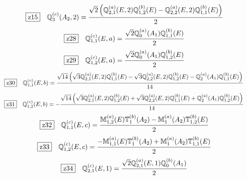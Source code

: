 \documentclass[fleqn,10pt,landscape]{jsarticle}
\begin{document}
\begin{dmath*}
\hspace*{3mm}\fbox{z15}\quad \mathbb{Q}_{3}^{(c)}(A_{2},2)=\frac{\sqrt{2} \left(\mathbb{Q}_{2,1}^{(a)}(E,2) \mathbb{Q}_{1,2}^{(b)}(E) - \mathbb{Q}_{2,2}^{(a)}(E,2) \mathbb{Q}_{1,1}^{(b)}(E)\right)}{2}
\end{dmath*}
\begin{dmath*}
\hspace*{3mm}\fbox{z28}\quad \mathbb{Q}_{1,1}^{(c)}(E,a)=\frac{\sqrt{2} \mathbb{Q}_{0}^{(a)}(A_{1}) \mathbb{Q}_{1,1}^{(b)}(E)}{2}
\end{dmath*}
\begin{dmath*}
\hspace*{3mm}\fbox{z29}\quad \mathbb{Q}_{1,2}^{(c)}(E,a)=\frac{\sqrt{2} \mathbb{Q}_{0}^{(a)}(A_{1}) \mathbb{Q}_{1,2}^{(b)}(E)}{2}
\end{dmath*}
\begin{dmath*}
\hspace*{3mm}\fbox{z30}\quad \mathbb{Q}_{1,1}^{(c)}(E,b)=\frac{\sqrt{14} \left(\sqrt{3} \mathbb{Q}_{2,1}^{(a)}(E,2) \mathbb{Q}_{1,1}^{(b)}(E) - \sqrt{3} \mathbb{Q}_{2,2}^{(a)}(E,2) \mathbb{Q}_{1,2}^{(b)}(E) - \mathbb{Q}_{2}^{(a)}(A_{1}) \mathbb{Q}_{1,1}^{(b)}(E)\right)}{14}
\end{dmath*}
\begin{dmath*}
\hspace*{3mm}\fbox{z31}\quad \mathbb{Q}_{1,2}^{(c)}(E,b)=- \frac{\sqrt{14} \left(\sqrt{3} \mathbb{Q}_{2,1}^{(a)}(E,2) \mathbb{Q}_{1,2}^{(b)}(E) + \sqrt{3} \mathbb{Q}_{2,2}^{(a)}(E,2) \mathbb{Q}_{1,1}^{(b)}(E) + \mathbb{Q}_{2}^{(a)}(A_{1}) \mathbb{Q}_{1,2}^{(b)}(E)\right)}{14}
\end{dmath*}
\begin{dmath*}
\hspace*{3mm}\fbox{z32}\quad \mathbb{Q}_{1,1}^{(c)}(E,c)=\frac{\mathbb{M}_{1,2}^{(a)}(E) \mathbb{T}_{1}^{(b)}(A_{2}) - \mathbb{M}_{1}^{(a)}(A_{2}) \mathbb{T}_{1,2}^{(b)}(E)}{2}
\end{dmath*}
\begin{dmath*}
\hspace*{3mm}\fbox{z33}\quad \mathbb{Q}_{1,2}^{(c)}(E,c)=\frac{- \mathbb{M}_{1,1}^{(a)}(E) \mathbb{T}_{1}^{(b)}(A_{2}) + \mathbb{M}_{1}^{(a)}(A_{2}) \mathbb{T}_{1,1}^{(b)}(E)}{2}
\end{dmath*}
\begin{dmath*}
\hspace*{3mm}\fbox{z34}\quad \mathbb{Q}_{2,1}^{(c)}(E,1)=\frac{\sqrt{2} \mathbb{Q}_{2,1}^{(a)}(E,1) \mathbb{Q}_{0}^{(b)}(A_{1})}{2}
\end{dmath*}
\end{document}
